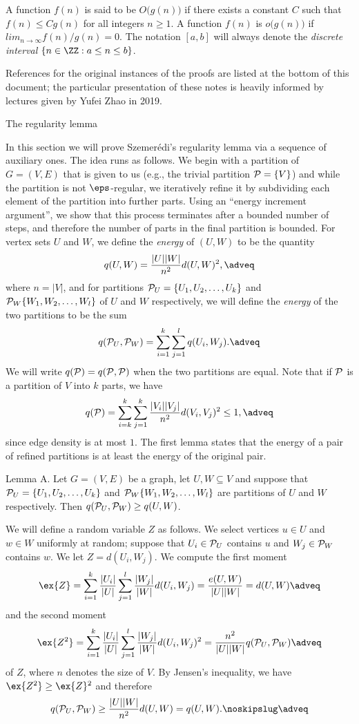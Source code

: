A function $f(n)$ is said to be $O\big(g(n)\big)$ if there exists a constant $C$ such that
$f(n)\leq Cg(n)$ for all integers $n\geq 1$. A function $f(n)$ is $o\big(g(n)\big)$ if $lim_{n\to\infty}
f(n)/g(n) = 0$.
The notation $[a,b]$ will always denote the {\it discrete interval} $\{n\in \ZZ : a\leq n\leq b\}$.

References for the original instances of the proofs are listed at the bottom of this document; the particular
presentation of these notes is heavily informed by lectures given by Yufei Zhao in 2019.

\advsect The regularity lemma

In this section we will prove Szemer\'edi's regularity lemma via a sequence of auxiliary ones. The idea runs
as follows. We begin with a partition of $G=(V,E)$ that is given to us
(e.g., the trivial partition $\P = \{V\}$) and while the partition
is not $\eps$-regular, we iteratively refine
it by subdividing each element of the partition into further parts.
Using an ``energy increment argument'', we show that this
process terminates after a bounded number of steps, and therefore the number of parts in the final partition
is bounded. For vertex sets $U$ and $W$, we define the {\it energy} of $(U,W)$
to be the quantity
$$q(U,W) = {|U||W|\over n^2}d(U,W)^2,\adveq$$
where $n=|V|$, and for partitions $\P_U = \{U_1,U_2, \ldots,U_k\}$ and $\P_W\{W_1,W_2,\ldots, W_l\}$
of $U$ and $W$ respectively, we will define the {\it energy} of the two partitions to be the sum
$$q(\P_U, \P_W) = \sum_{i=1}^k\sum_{j=1}^l q(U_i, W_j).\adveq$$
We will write $q(\P) = q(\P,\P)$ when the two partitions are equal. Note that if $\P$ is a partition of
$V$ into $k$ parts, we have
$$q(\P) = \sum_{i=k}^k\sum_{j=1}^k {|V_i||V_j|\over n^2} d(V_i,V_j)^2 \leq 1,\adveq$$
since edge density is at most $1$.
The first lemma states that the energy of a pair of refined partitions is at least the energy of the original
pair.

\proclaim Lemma A. Let $G=(V,E)$ be a graph, let $U,W\subseteq V$ and suppose that
$\P_U = \{U_1,U_2, \ldots,U_k\}$ and $\P_W\{W_1,W_2,\ldots, W_l\}$ are partitions of $U$ and $W$ respectively.
Then $q(\P_U,\P_W)\geq q(U,W)$.

\proof We will define a random variable $Z$ as follows. We select vertices $u\in U$ and $w\in W$ uniformly
at random; suppose that $U_i\in \P_U$ contains $u$ and $W_j\in \P_W$ contains $w$. We let $Z = d(U_i,W_j)$.
We compute the first moment
$$\ex\{Z\} = \sum_{i=1}^k{|U_i|\over |U|}\sum_{j=1}^l {|W_j|\over|W|} d(U_i,W_j) = {e(U,W)\over |U||W|} = d(U,W)
\adveq$$
and the second moment
$$\ex\{Z^2\}=\sum_{i=1}^k{|U_i|\over |U|}\sum_{j=1}^l {|W_j|\over|W|} d(U_i,W_j)^2={n^2\over |U||W|}q(\P_U,\P_W)
\adveq$$
of $Z$, where $n$ denotes the size of $V$. By Jensen's inequality, we have $\ex\{Z^2\}\geq\ex\{Z\}^2$ and therefore
$$q(\P_U,\P_W)\geq {|U||W|\over n^2}d(U,W) = q(U,W).\noskipslug\adveq$$

